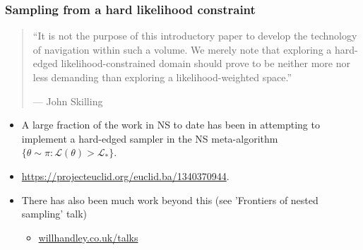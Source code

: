 \documentclass[aspectratio=169]{beamer}
\begin{document}
\begin{frame}
\begin{columns}
    \end{columns}
\end{frame}

\begin{frame}
  \frametitle{Sampling from a hard likelihood constraint} 
  
  \begin{quote}
    ``It is not the purpose of this introductory paper to develop the technology of navigation within such a volume. We merely note that exploring a hard-edged likelihood-constrained domain should prove to be neither more nor less demanding than exploring a likelihood-weighted space.''
    
   {\hfill --- John Skilling}
  \end{quote}

  \begin{itemize}
      
    \item A large fraction of the work in NS to date has been in attempting to implement a hard-edged sampler in the NS meta-algorithm $\{\theta\sim \pi : \mathcal{L}(\theta)>\mathcal{L}_* \}$.
    \item \url{https://projecteuclid.org/euclid.ba/1340370944}.
    \item There has also been much work beyond this (see 'Frontiers of nested sampling' talk)
        \begin{itemize}
            \item \href{https://www.willhandley.co.uk/talks}{willhandley.co.uk/talks}
        \end{itemize}
  \end{itemize}
 
\end{frame}
\end{document}
